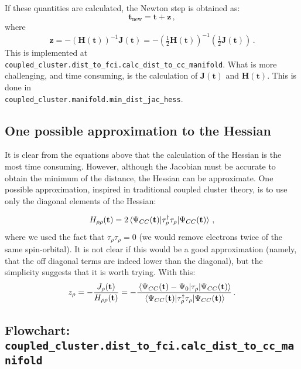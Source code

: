 If these quantities are calculated, the Newton step is obtained as:
\begin{equation}\label{eq:cc_minD_update}
  \mathbf{t}_\text{new} = \mathbf{t} + \mathbf{z}\,,
\end{equation}
where
\begin{equation}\label{eq:cc_minD_z}
  \mathbf{z}
  = - \left(\mathbf{H}(\mathbf{t})\right)^{-1}\mathbf{J}(\mathbf{t})
  = - \left(\tfrac{1}{2}\mathbf{H}(\mathbf{t})\right)^{-1}
  \left(\tfrac{1}{2}\mathbf{J}(\mathbf{t})\right)\,.
\end{equation}
This is implemented at \texttt{coupled\_cluster.dist\_to\_fci.calc\_dist\_to\_cc\_manifold}.
What is more challenging, and time consuming, is the calculation of $\mathbf{J}(\mathbf{t})$ and
$\mathbf{H}(\mathbf{t})$.
This is done in\\ \texttt{coupled\_cluster.manifold.min\_dist\_jac\_hess}.

\subsection{One possible approximation to the Hessian}
\hypertarget{sec:cc_man_appr_hess}{}
\label{sec:cc_man_appr_hess}

It is clear from the equations above that the calculation of the Hessian is the most time consuming.
However, although the Jacobian must be accurate to obtain the minimum of the distance,
the Hessian can be approximate.
One possible approximation, inspired in traditional coupled cluster theory,
is to use only the diagonal elements of the Hessian:

\begin{equation}\label{eq:cc_minD_hess_diag}
  \begin{split}
    H_{\rho\rho}(\mathbf{t}) =
    2\mel{\Psi_{CC}(\mathbf{t})}{\tau_\rho^\dagger\tau_\rho}{\Psi_{CC}(\mathbf{t})}\,,
  \end{split}
\end{equation}
where we used the fact that $\tau_\rho\tau_\rho = 0$
(we would remove electrons twice of the same spin-orbital).
It is not clear if this would be a good approximation
(namely, that the off diagonal terms are indeed lower than the diagonal),
but the simplicity suggests that it is worth trying.
With this:
\begin{equation}\label{eq:cc_minD_z_diag}
  z_\rho
  = - \frac{J_\rho(\mathbf{t})}{H_{\rho\rho}(\mathbf{t})}
  = - \frac{\mel{\Psi_{CC}(\mathbf{t}) - \Psi_0}{\tau_\rho}{\Psi_{CC}(\mathbf{t})}}
  {\mel{\Psi_{CC}(\mathbf{t})}{\tau_\rho^\dagger\tau_\rho}{\Psi_{CC}(\mathbf{t})}}\,.
\end{equation}

\newpage
\subsection{Flowchart: \texttt{coupled\_cluster.dist\_to\_fci.calc\_dist\_to\_cc\_manifold}}



